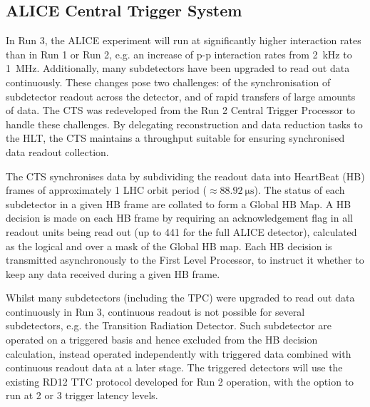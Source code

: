 \subsection{ALICE Central Trigger System}

In Run 3, the ALICE experiment will run at significantly higher interaction rates than in Run 1 or Run 2, e.g. an increase of p-p interaction rates from \SI{2}{\kilo\hertz} to \SI{1}{\mega\hertz}. Additionally, many subdetectors have been upgraded to read out data continuously. These changes pose two challenges: of the synchronisation of subdetector readout across the detector, and of rapid transfers of large amounts of data. The CTS was redeveloped from the Run 2 Central Trigger Processor to handle these challenges. By delegating reconstruction and data reduction tasks to the HLT, the CTS maintains a throughput suitable for ensuring synchronised data readout collection.

The CTS synchronises data by subdividing the readout data into HeartBeat (HB) frames of approximately 1 LHC orbit period ($\approx\SI{88.92}{\micro\second}$). The status of each subdetector in a given HB frame are collated to form a Global HB Map. A HB decision is made on each HB frame by requiring an acknowledgement flag in all readout units being read out (up to 441 for the full ALICE detector), calculated as the logical and over a mask of the Global HB map. Each HB decision is transmitted asynchronously to the First Level Processor, to instruct it whether to keep any data received during a given HB frame.

Whilst many subdetectors (including the TPC) were upgraded to read out data continuously in Run 3, continuous readout is not possible for several subdetectors, e.g. the Transition Radiation Detector. Such subdetector are operated on a triggered basis and hence excluded from the HB decision calculation, instead operated independently with triggered data combined with continuous readout data at a later stage. The triggered detectors will use the existing RD12 TTC protocol developed for Run 2 operation, with the option to run at 2 or 3 trigger latency levels.